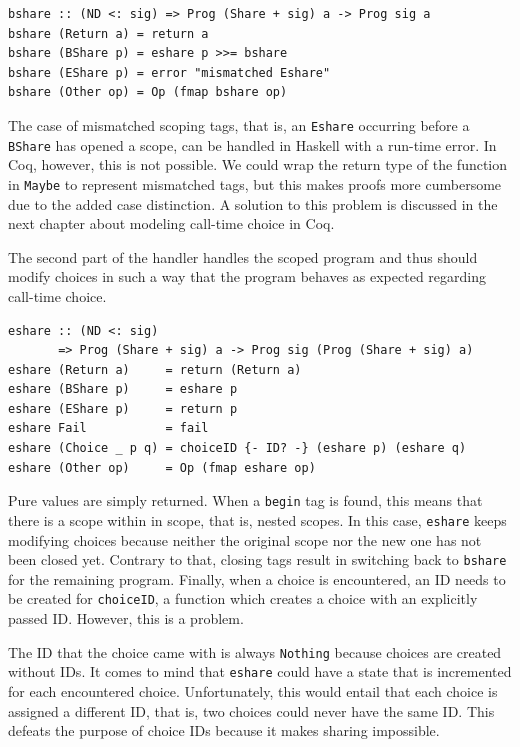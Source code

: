 \documentclass[a4paper, 11pt, fleqn, twoside]{scrreprt}
\newcommand{\hinl}[1]{\texttt{#1}}
\begin{document}
\begin{verbatim}
bshare :: (ND <: sig) => Prog (Share + sig) a -> Prog sig a
bshare (Return a) = return a
bshare (BShare p) = eshare p >>= bshare
bshare (EShare p) = error "mismatched Eshare"
bshare (Other op) = Op (fmap bshare op)
\end{verbatim}

The case of mismatched scoping tags, that is, an \hinl{Eshare} occurring before a \hinl{BShare} has opened a scope, can be handled in Haskell with a run-time error.
In Coq, however, this is not possible.
We could wrap the return type of the function in \hinl{Maybe} to represent mismatched tags, but this makes proofs more cumbersome due to the added case distinction.
A solution to this problem is discussed in the next chapter about modeling call-time choice in Coq.

The second part of the handler handles the scoped program and thus should modify choices in such a way that the program behaves as expected regarding call-time choice.

\begin{verbatim}
eshare :: (ND <: sig)
       => Prog (Share + sig) a -> Prog sig (Prog (Share + sig) a)
eshare (Return a)     = return (Return a)
eshare (BShare p)     = eshare p
eshare (EShare p)     = return p
eshare Fail           = fail
eshare (Choice _ p q) = choiceID {- ID? -} (eshare p) (eshare q)
eshare (Other op)     = Op (fmap eshare op)
\end{verbatim}

Pure values are simply returned.
When a \hinl{begin} tag is found, this means that there is a scope within in scope, that is, nested scopes.
In this case, \hinl{eshare} keeps modifying choices because neither the original scope nor the new one has not been closed yet.
Contrary to that, closing tags result in switching back to \hinl{bshare} for the remaining program.
Finally, when a choice is encountered, an ID needs to be created for  \hinl{choiceID}, a function which creates a choice with an explicitly passed ID.
However, this is a problem.

The ID that the choice came with is always \hinl{Nothing} because choices are created without IDs.
It comes to mind that \hinl{eshare} could have a state that is incremented for each encountered choice.
Unfortunately, this would entail that each choice is assigned a different ID, that is, two choices could never have the same ID.
This defeats the purpose of choice IDs because it makes sharing impossible.
\end{document}
